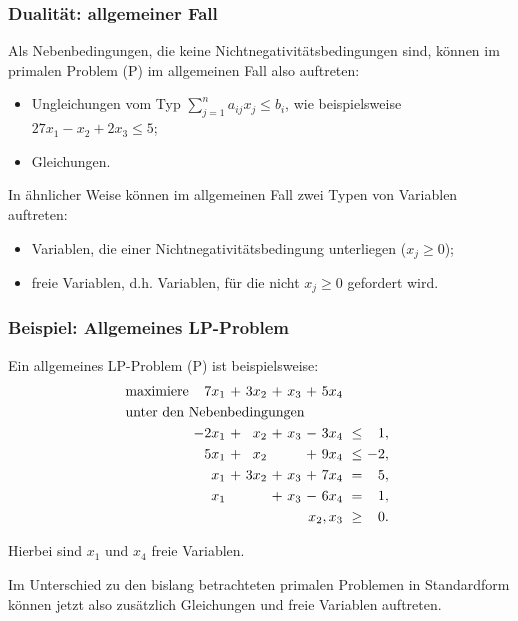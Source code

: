\documentclass[smaller]{beamer}
\begin{document}
\begin{frame}
 \frametitle{Dualität: allgemeiner Fall}
 {Als Nebenbedingungen, die keine Nichtnegativitätsbedingungen sind, können im primalen Problem (P) im allgemeinen Fall also auftreten}:
\begin{itemize}
\item \alert{Ungleichungen} vom Typ $\sum\limits_{j=1}^{n}{a_{ij}x_j} \leq b_i$, wie beispielsweise $27x_1-x_2+2x_3 \leq 5$;
\item \alert{Gleichungen}.
\end{itemize} 

{In ähnlicher Weise können im allgemeinen Fall zwei Typen von Variablen auftreten}:
\begin{itemize}
\item \alert{Variablen, die einer Nichtnegativitätsbedingung unterliegen} ($x_j \geq 0$);
\item \alert{freie Variablen}, d.h. Variablen, für die nicht $x_j \geq 0$ gefordert wird.
\end{itemize}
\end{frame}

\begin{frame}
 \frametitle{Beispiel: Allgemeines LP-Problem}
 Ein allgemeines LP-Problem (P) ist beispielsweise:
\begin{align*}
\begin{alignedat}{6}
& \text{maximiere } & 7x_1 &\ + &\ 3x_2 &\ + &\ x_3 &\ + &\ 5x_4 & & \\
& \rlap{unter den Nebenbedingungen} & & & & & & & & & \\
&& -2x_1 &\ + &\  x_2 &\ + &\ x_3 &\ - &\ 3x_4 &\ \leq &\  1,\ \\
&&  5x_1 &\ + &\  x_2 &\   &\     &\ + &\ 9x_4 &\ \leq &\ -2,\ \\
&&   x_1 &\ + &\ 3x_2 &\ + &\ x_3 &\ + &\ 7x_4 &\    = &\  5,\ \\
&&   x_1 &\   &\      &\ + &\ x_3 &\ - &\ 6x_4 &\    = &\  1,\ \\
&& & & & & & & \llap{$x_2,x_3$} &\ \geq &\ 0.\
\end{alignedat}
\end{align*}

Hierbei sind $x_1$ und $x_4$ freie Variablen. \\ \vspace*{0.2cm}

Im Unterschied zu den bislang betrachteten primalen Problemen in Standardform können jetzt also \alert{zusätzlich Gleichungen und freie Variablen} auftreten.
\end{frame}
\end{document}
